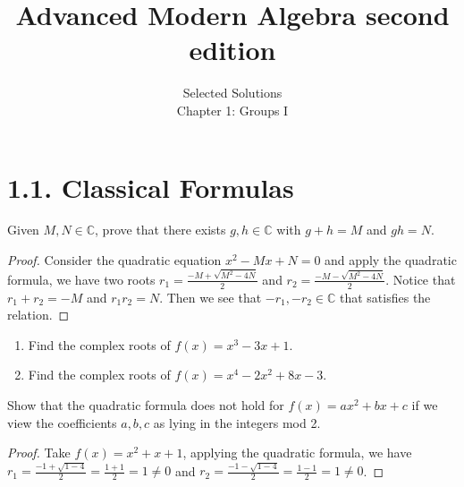\documentclass[12pt]{article}
\newenvironment{exercise}[2][Exercise]{\begin{trivlist}
\item[\hskip \labelsep {\bfseries #1}\hskip \labelsep {\bfseries #2.}]}
{\end{trivlist}}
\begin{document}
 
\onehalfspacing
 
\title{Advanced Modern Algebra second edition} 
\author{Selected Solutions\\ 
Chapter 1: Groups I}
 
\maketitle

\section*{1.1.  Classical Formulas}


\begin{exercise}{1.1} 
    Given $M, N \in \mathbb{C}$, prove that there exists $g, h \in \mathbb{C}$ with $g+h=M$ and $gh=N$.
\end{exercise}

\begin{proof}
    Consider the quadratic equation $x^2-Mx+N=0$ and apply the quadratic formula, we have two roots ${r_1 = \frac{-M+ \sqrt{M^2-4N}}2} $ and ${r_2 = \frac{-M - \sqrt{M^2-4N}}2}$. Notice that ${r_1+r_2=-M}$ and ${r_1r_2=N}$. Then we see that $-r_1, -r_2 \in \mathbb{C}$ that satisfies the relation.
\end{proof}


\begin{exercise}{1.3}
    \begin{enumerate}
        \item[(i)] Find the complex roots of $f(x)=x^3-3x+1$.
        \item[(ii)] Find the complex roots of $f(x)=x^4-2x^2+8x-3$.
    \end{enumerate}
\end{exercise}
 


 \begin{exercise}{1.4}
    Show that the quadratic formula does not hold for $f(x)=ax^2+bx+c$ if we view the coefficients $a,b,c$ as lying in the integers mod 2.
 \end{exercise}

 \begin{proof}
    Take $f(x) =x^2+x+1$, applying the quadratic formula, we have $r_1= \frac{-1 + \sqrt{1-4}}2 = \frac{1 + 1}2=1\neq0$ and $r_2= \frac{-1 - \sqrt{1-4}}2 = \frac{1 - 1}2=1\neq0$.
 \end{proof}
\end{document}
